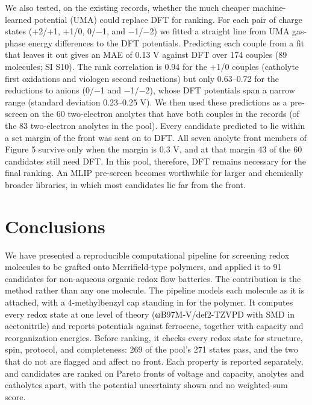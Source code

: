 \documentclass[journal=jcisd8,manuscript=article]{achemso}
\begin{document}
We also tested, on the existing records, whether the much cheaper machine-learned potential (UMA) could replace DFT for ranking. For each pair of charge states (+2/+1, +1/0, 0/−1, and −1/−2) we fitted a straight line from UMA gas-phase energy differences to the DFT potentials. Predicting each couple from a fit that leaves it out gives an MAE of 0.13 V against DFT over 174 couples (89 molecules; SI S10). The rank correlation is 0.94 for the +1/0 couples (catholyte first oxidations and viologen second reductions) but only 0.63–0.72 for the reductions to anions (0/−1 and −1/−2), whose DFT potentials span a narrow range (standard deviation 0.23–0.25 V). We then used these predictions as a pre-screen on the 60 two-electron anolytes that have both couples in the records (of the 83 two-electron anolytes in the pool). Every candidate predicted to lie within a set margin of the front was sent on to DFT. All seven anolyte front members of Figure 5 survive only when the margin is 0.3 V, and at that margin 43 of the 60 candidates still need DFT. In this pool, therefore, DFT remains necessary for the final ranking. An MLIP pre-screen becomes worthwhile for larger and chemically broader libraries, in which most candidates lie far from the front.

\section{Conclusions}

We have presented a reproducible computational pipeline for screening redox molecules to be grafted onto Merrifield-type polymers, and applied it to 91 candidates for non-aqueous organic redox flow batteries. The contribution is the method rather than any one molecule. The pipeline models each molecule as it is attached, with a 4-methylbenzyl cap standing in for the polymer. It computes every redox state at one level of theory (ωB97M-V/def2-TZVPD with SMD in acetonitrile) and reports potentials against ferrocene, together with capacity and reorganization energies. Before ranking, it checks every redox state for structure, spin, protocol, and completeness: 269 of the pool's 271 states pass, and the two that do not are flagged and affect no front. Each property is reported separately, and candidates are ranked on Pareto fronts of voltage and capacity, anolytes and catholytes apart, with the potential uncertainty shown and no weighted-sum score.
\end{document}
